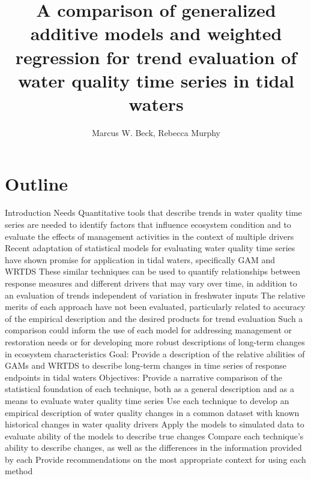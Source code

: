 \documentclass[letterpaper,12pt]{article}\usepackage[]{graphicx}\usepackage[]{color}
\begin{document}
\setlength{\parskip}{5mm}
\setlength{\parindent}{0in}

\title{A comparison of generalized additive models and weighted regression for trend evaluation of water quality time series in tidal waters}
\author{Marcus W. Beck, Rebecca Murphy}
\maketitle

\section{Outline}
\begin{outline}

\0 Introduction
\1 Needs
\2 Quantitative tools that describe trends in water quality time series are needed to identify factors that influence ecosystem condition and to evaluate the effects of management activities in the context of multiple drivers
\2 Recent adaptation of statistical models for evaluating water quality time series have shown promise for application in tidal waters, specifically \ac{GAM} and \ac{WRTDS}
\2 These similar techniques can be used to quantify relationships between response measures and different drivers that may vary over time, in addition to an evaluation of trends independent of variation in freshwater inputs
\2 The relative merits of each approach have not been evaluated, particularly related to accuracy of the empirical description and the desired products for trend evaluation
\2 Such a comparison could inform the use of each model for addressing management or restoration needs or for developing more robust descriptions of long-term changes in ecosystem characteristics
\1 Goal: Provide a description of the relative abilities of \acp{GAM} and \ac{WRTDS} to describe long-term changes in time series of response endpoints in tidal waters
\1 Objectives:
\2 Provide a narrative comparison of the statistical foundation of each technique, both as a general description and as a means to evaluate water quality time series
\2 Use each technique to develop an empirical description of water quality changes in a common dataset with known historical changes in water quality drivers
\2 Apply the models to simulated data to evaluate ability of the models to describe true changes
\2 Compare each technique's ability to describe changes, as well as the differences in the information provided by each
\2 Provide recommendations on the most appropriate context for using each method


\end{outline}
\end{document}
